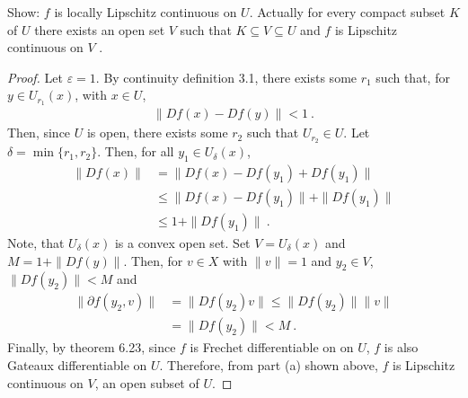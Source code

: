 \begin{questions}
{Show: $f$ is locally Lipschitz continuous on $U$. Actually for every compact
subset $K$ of $U$ there exists an open set $V$ such that $K \subseteq V \subseteq U$ and $f$ is
Lipschitz continuous on $V$ .}

\begin{solution}
  \begin{proof}
  Let $\varepsilon = 1$. By continuity definition 3.1, there exists some $r_1$ such that, for $y \in U_{r_1}(x)$, with $x \in U$,
  \begin{align*}
  \|Df(x) - Df(y)\| < 1~.
  \end{align*}
  Then, since $U$ is open, there exists some $r_2$ such that $U_{r_2} \in U$. Let $\delta = \min \{r_1, r_2\}$. Then, for all $y_1 \in U_{\delta}(x)$,
  \begin{align*}
  \|Df(x)\| &= \|Df(x) - Df(y_1) + Df(y_1)\| \\
  & \leq \|Df(x) - Df(y_1)\| + \|Df(y_1)\| \\
  & \leq 1 + \|Df(y_1)\|~.
  \end{align*}
Note, that $U_{\delta}(x)$ is a convex open set. Set $V = U_{\delta}(x)$  and $M = 1 + \|Df(y)\|$. Then, for $v \in X$ with $\|v\| = 1$ and $y_2 \in V$, $\|Df(y_2)\| < M$ and
\begin{align*}
\|\partial f(y_2, v)\| & = \|Df(y_2)v\| \leq \|Df(y_2)\| \|v\| \\
& = \|Df(y_2)\| < M~.
\end{align*}
Finally, by theorem 6.23, since $f$ is Frechet differentiable on on $U$, $f$ is also Gateaux differentiable on $U$. Therefore, from part (a) shown above, $f$ is Lipschitz continuous on $V$, an open subset of $U$.

\end{proof}
\end{solution}

\end{questions}